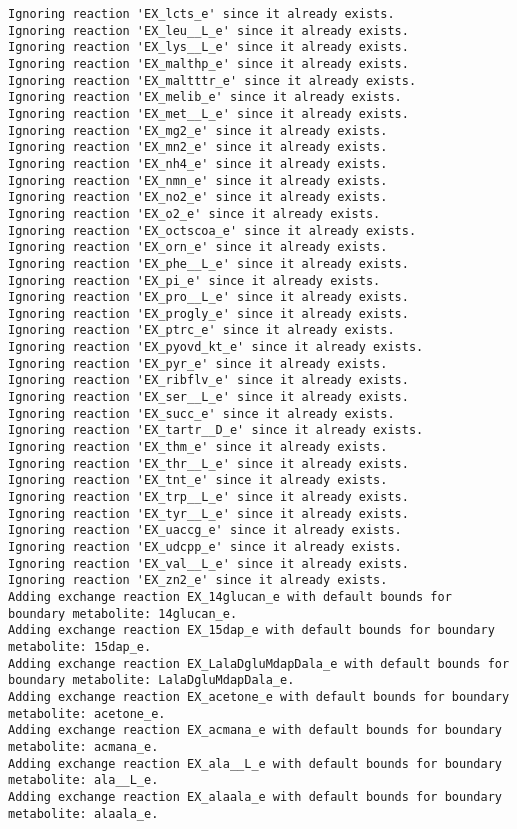 \documentclass[
  letterpaper,
  DIV=11,
  numbers=noendperiod]{scrartcl}
\begin{document}
\begin{verbatim}
Ignoring reaction 'EX_lcts_e' since it already exists.
Ignoring reaction 'EX_leu__L_e' since it already exists.
Ignoring reaction 'EX_lys__L_e' since it already exists.
Ignoring reaction 'EX_malthp_e' since it already exists.
Ignoring reaction 'EX_maltttr_e' since it already exists.
Ignoring reaction 'EX_melib_e' since it already exists.
Ignoring reaction 'EX_met__L_e' since it already exists.
Ignoring reaction 'EX_mg2_e' since it already exists.
Ignoring reaction 'EX_mn2_e' since it already exists.
Ignoring reaction 'EX_nh4_e' since it already exists.
Ignoring reaction 'EX_nmn_e' since it already exists.
Ignoring reaction 'EX_no2_e' since it already exists.
Ignoring reaction 'EX_o2_e' since it already exists.
Ignoring reaction 'EX_octscoa_e' since it already exists.
Ignoring reaction 'EX_orn_e' since it already exists.
Ignoring reaction 'EX_phe__L_e' since it already exists.
Ignoring reaction 'EX_pi_e' since it already exists.
Ignoring reaction 'EX_pro__L_e' since it already exists.
Ignoring reaction 'EX_progly_e' since it already exists.
Ignoring reaction 'EX_ptrc_e' since it already exists.
Ignoring reaction 'EX_pyovd_kt_e' since it already exists.
Ignoring reaction 'EX_pyr_e' since it already exists.
Ignoring reaction 'EX_ribflv_e' since it already exists.
Ignoring reaction 'EX_ser__L_e' since it already exists.
Ignoring reaction 'EX_succ_e' since it already exists.
Ignoring reaction 'EX_tartr__D_e' since it already exists.
Ignoring reaction 'EX_thm_e' since it already exists.
Ignoring reaction 'EX_thr__L_e' since it already exists.
Ignoring reaction 'EX_tnt_e' since it already exists.
Ignoring reaction 'EX_trp__L_e' since it already exists.
Ignoring reaction 'EX_tyr__L_e' since it already exists.
Ignoring reaction 'EX_uaccg_e' since it already exists.
Ignoring reaction 'EX_udcpp_e' since it already exists.
Ignoring reaction 'EX_val__L_e' since it already exists.
Ignoring reaction 'EX_zn2_e' since it already exists.
Adding exchange reaction EX_14glucan_e with default bounds for boundary metabolite: 14glucan_e.
Adding exchange reaction EX_15dap_e with default bounds for boundary metabolite: 15dap_e.
Adding exchange reaction EX_LalaDgluMdapDala_e with default bounds for boundary metabolite: LalaDgluMdapDala_e.
Adding exchange reaction EX_acetone_e with default bounds for boundary metabolite: acetone_e.
Adding exchange reaction EX_acmana_e with default bounds for boundary metabolite: acmana_e.
Adding exchange reaction EX_ala__L_e with default bounds for boundary metabolite: ala__L_e.
Adding exchange reaction EX_alaala_e with default bounds for boundary metabolite: alaala_e.

\end{verbatim}
\end{document}

